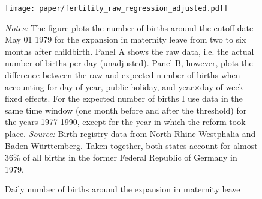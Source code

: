 \documentclass[11pt, a4paper,draft]{article} %
\begin{document}

	\vspace*{\fill}
\begin{figure}[H]\centering
	\caption{Daily number of births around the expansion in maternity leave}\label{fig: fertilitydistr}
	\texttt{[image: paper/fertility\_raw\_regression\_adjusted.pdf]}
	\scriptsize
	\begin{minipage}{0.9 \linewidth}
		\emph{Notes:} The figure plots the number of births around the cutoff date May 01 1979 for the expansion in maternity leave from two to six months after childbirth. Panel A shows the raw data, i.e. the actual number of births per day (unadjusted). Panel B, however, plots the difference between the raw and expected number of births when accounting for day of year, public holiday, and year$\times$day of week fixed effects. For the expected number of births I use data in the same time window (one month before and after the threshold) for the years 1977-1990, except for the year in which the reform took place. \newline\emph{Source:} Birth registry data from North Rhine-Westphalia and Baden-Württemberg. Taken together, both states account for almost 36\% of all births in the former Federal Republic of Germany in 1979.
	\end{minipage}
\end{figure}
\vspace*{\fill}\clearpage
\end{document}
